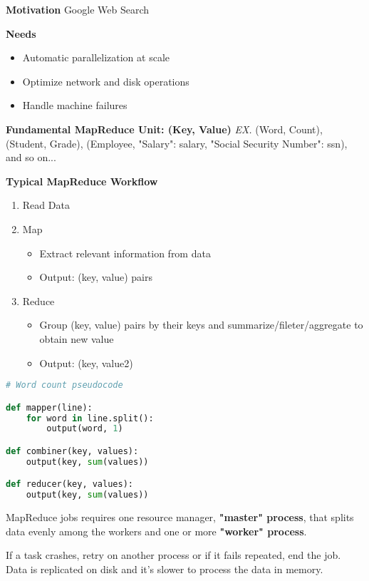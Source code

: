 \documentclass{article}
\begin{document}
\textbf{Motivation} Google Web Search

\textbf{Needs}

\begin{itemize}
    \item Automatic parallelization at scale
    \item Optimize network and disk operations
    \item Handle machine failures
\end{itemize} 

\textbf{Fundamental MapReduce Unit: (Key, Value)}
\textit{EX.} (Word, Count), (Student, Grade), (Employee, {"Salary": salary, "Social Security Number": ssn}), and so on...

\textbf{Typical MapReduce Workflow}
\begin{enumerate}
    \item Read Data
    \item Map
    \begin{itemize}
        \item Extract relevant information from data
        \item Output: (key, value) pairs
    \end{itemize}
    \item Reduce
    \begin{itemize}
        \item Group (key, value) pairs by their keys and summarize/fileter/aggregate to obtain new value
        \item Output: (key, value2)
    \end{itemize}
\end{enumerate}

\begin{lstlisting}[language=Python]
# Word count pseudocode

def mapper(line):
    for word in line.split():
        output(word, 1)

def combiner(key, values):
    output(key, sum(values))

def reducer(key, values):
    output(key, sum(values))
\end{lstlisting}

MapReduce jobs requires one resource manager, \textbf{"master" process}, that splits data evenly among the workers and one or more \textbf{"worker" process}.

If a task crashes, retry on another process or if it fails repeated, end the job. Data is replicated on disk and it's slower to process the data in memory.
\end{document}
